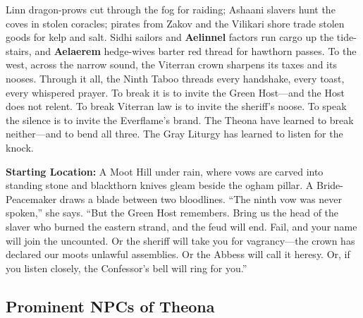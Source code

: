 Linn dragon-prows cut through the fog for raiding; Ashaani slavers hunt the coves in stolen coracles; pirates from Zakov and the Vilikari shore trade stolen goods for kelp and salt. Sidhi sailors and \textbf{Aelinnel} factors run cargo up the tide-stairs, and \textbf{Aelaerem} hedge-wives barter red thread for hawthorn passes. To the west, across the narrow sound, the Viterran crown sharpens its taxes and its nooses. Through it all, the Ninth Taboo threads every handshake, every toast, every whispered prayer. To break it is to invite the Green Host---and the Host does not relent. To break Viterran law is to invite the sheriff's noose. To speak the silence is to invite the Everflame's brand. The Theona have learned to break neither---and to bend all three. The Gray Liturgy has learned to listen for the knock.

\noindent\textbf{Starting Location:} A Moot Hill under rain, where vows are carved into standing stone and blackthorn knives gleam beside the ogham pillar. A Bride-Peacemaker draws a blade between two bloodlines. ``The ninth vow was never spoken,'' she says. ``But the Green Host remembers. Bring us the head of the slaver who burned the eastern strand, and the feud will end. Fail, and your name will join the uncounted. Or the sheriff will take you for vagrancy---the crown has declared our moots unlawful assemblies. Or the Abbess will call it heresy. Or, if you listen closely, the Confessor's bell will ring for you.''

\subsection*{Prominent NPCs of Theona}
\label{sec:theona-npcs}

